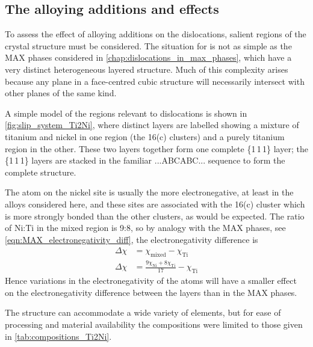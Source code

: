 \subsection{The alloying additions and effects}

To assess the effect of alloying additions on the dislocations, salient regions of the crystal structure must be considered. The situation for  is not as simple as the MAX phases considered in \autoref{chap:dislocations_in_max_phases}, which have a very distinct heterogeneous layered structure. Much of this complexity arises because any plane in a face-centred cubic structure will necessarily intersect with other planes of the same kind.

A simple model of the regions relevant to dislocations is shown in \autoref{fig:slip_system_Ti2Ni}, where distinct layers are labelled showing a mixture of titanium and nickel in one region (the 16(c) clusters) and a purely titanium region in the other. These two layers together form one complete \{1\,1\,1\} layer; the \{1\,1\,1\} layers are stacked in the familiar ...ABCABC... sequence to form the complete structure.

The atom on the nickel site is usually the more electronegative, at least in the alloys considered here, and these sites are associated with the 16(c) cluster which is more strongly bonded than the other clusters, as would be expected. The ratio of Ni:Ti in the mixed region is 9:8, so by analogy with the MAX phases, see \autoref{eqn:MAX_electronegativity_diff}, the electronegativity difference is
\begin{align}
\Delta \chi &= \chi_{\text{mixed}} - \chi_{\text{Ti}} \nonumber\\
\Delta \chi &= \frac{9\chi_{\text{Ni}} + 8\chi_{\text{Ti}}}{17} - \chi_{\text{Ti}}
\end{align}
Hence variations in the electronegativity of the atoms will have a smaller  effect on the electronegativity difference between the layers than in the MAX phases.

The  structure can accommodate a wide variety of elements, but for ease of processing and material availability the compositions were limited to those given in \autoref{tab:compositions_Ti2Ni}. 

